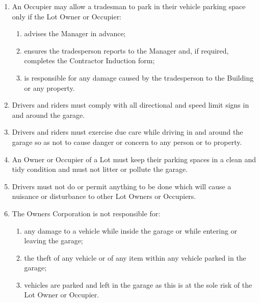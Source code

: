 \documentclass{article}
\begin{document}
\begin{enumerate}[label=\arabic*.]
\begin{enumerate}[label=\arabic{enumi}.\arabic*.]
\begin{enumerate}[label=(\arabic*)]
\item  An Occupier may allow a tradesman to park in their vehicle parking space only if the Lot Owner or Occupier:

\begin{enumerate}[label=(\alph*)]

\item  advises the Manager in advance;

\item  ensures the tradesperson reports to the Manager and, if required, completes the Contractor Induction form;

\item  is responsible for any damage caused by the tradesperson to the Building or any property.

\end{enumerate}

\item  Drivers and riders must comply with all directional and speed limit signs in and around the garage.

\item  Drivers and riders must exercise due care while driving in and around the garage so as not to cause danger or concern to any person or to property.

\item  An Owner or Occupier of a Lot must keep their parking spaces in a clean and tidy condition and must not litter or pollute the garage.

\item  Drivers must not do or permit anything to be done which will cause a nuisance or disturbance to other Lot Owners or Occupiers.

\item  The Owners Corporation is not responsible for:

\begin{enumerate}[label=(\alph*)]

\item  any damage to a vehicle while inside the garage or while entering or leaving the garage;

\item  the theft of any vehicle or of any item within any vehicle parked in the garage;

\item  vehicles are parked and left in the garage as this is at the sole risk of the Lot Owner or Occupier.

\end{enumerate}


\end{enumerate}
\end{enumerate}
\end{enumerate}
\end{document}
